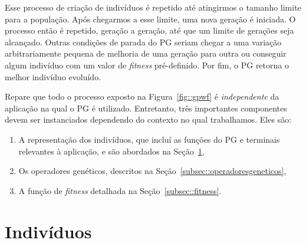 Esse processo de criação de indivíduos é repetido até atingirmos o tamanho limite para a população. Após chegarmos a esse limite, uma nova geração é iniciada.
O processo então é repetido, geração a geração, até que um limite de gerações seja alcançado.
Outras condições de parada do \textsc{PG} seriam chegar a uma variação arbitrariamente pequena de melhoria de uma geração para outra ou conseguir algum indivíduo com um valor de \textit{fitness} pré-definido. Por fim, o \textsc{PG} retorna o melhor indivíduo evoluído.


Repare que todo o processo exposto na Figura~\ref{fig::gpwf} é \textit{independente} da aplicação na qual o \textsc{PG} é utilizado.
Entretanto, três importantes componentes devem ser instanciados dependendo do contexto no qual trabalhamos. Eles são:
\begin{enumerate}
\item A representação dos indivíduos, que incluí as funções do \textsc{PG} e terminais relevantes à aplicação, e são abordados na Seção~\ref{subsec::individuos},
\item Os operadores genéticos, descritos na Seção~\ref{subsec::operadoresgeneticos},
\item A função de \textit{fitness} detalhada na Seção~\ref{subsec::fitness}.
\end{enumerate}

\section{Indivíduos}
\label{subsec::individuos}

